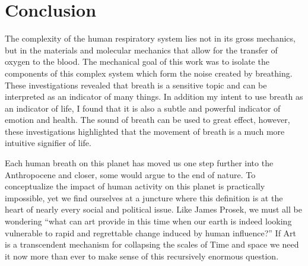 \documentclass[letterpaper]{article}
\begin{document}
\section{Conclusion}


The complexity of the human respiratory system lies not in its gross mechanics, but in the materials and molecular mechanics that allow for the transfer of oxygen to the blood. The mechanical goal of this work was to isolate the components of this complex system which form the noise created by breathing. These investigations revealed that breath is a sensitive topic and can be interpreted as an indicator of many things. In addition my intent to use breath as an indicator of life, I found that it is also a subtle and powerful indicator of emotion and health. The sound of breath can be used to great effect, however, these investigations highlighted that the movement of breath is a much more intuitive signifier of life. 

Each human breath on this planet has moved us one step further into the Anthropocene and closer, some would argue to the end of nature. To conceptualize the impact of human activity on this planet is practically impossible, yet we find ourselves at a juncture where this definition is at the heart of nearly every social and political issue. Like James Prosek, we must all be wondering ``what can art provide in this time when our earth is indeed looking vulnerable to rapid and regrettable change induced by human influence?''\cite{prosek} If Art is a transcendent mechanism for collapsing the scales of Time and space we need it now more than ever to make sense of this recursively enormous question.
\end{document}
